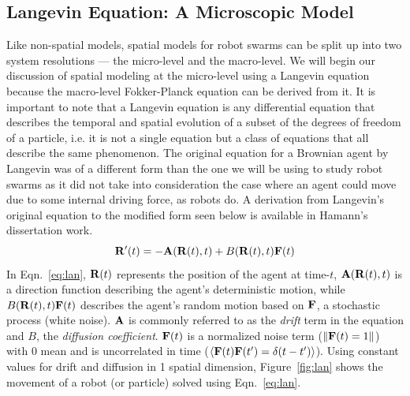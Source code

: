 \documentclass[Main.tex]{subfiles}
\begin{document}
\subsection{Langevin Equation: A Microscopic Model}
Like non-spatial models, spatial models for robot swarms can be split up into two system resolutions --- the micro-level and the macro-level. We will begin our discussion of spatial modeling at the micro-level using a Langevin equation because the macro-level Fokker-Planck equation can be derived from it. It is important to note that a Langevin equation is any differential equation that describes the temporal and spatial evolution of a subset of the degrees of freedom of a particle, i.e. it is not a single equation but a class of equations that all describe the same phenomenon. The original equation for a Brownian agent by Langevin was of a different form than the one we will be using to study robot swarms as it did not take into consideration the case where an agent could move due to some internal driving force, as robots do. A derivation from Langevin's original equation to the modified form seen below is available in Hamann's dissertation work\citep{Hamann2010}.
\begin{equation}\label{eq:lan}
\mathbf{R}'(t) = -\mathbf{A}(\mathbf{R}(t),t) + B(\mathbf{R}(t),t)\mathbf{F}(t)
\end{equation}
In Eqn.~\eqref{eq:lan}, $\mathbf{R}(t)$ represents the position of the agent at time-$t$, $\mathbf{A}(\mathbf{R}(t),t)$ is a direction function describing the agent's deterministic motion, while $B(\mathbf{R}(t),t)\mathbf{F}(t)$ describes the agent's random motion based on $\mathbf{F}$, a stochastic process (white noise). $\mathbf{A}$ is commonly referred to as the \emph{drift} term in the equation and $B$, the \emph{diffusion coefficient}. $\mathbf{F}(t)$ is a normalized noise term ($\lVert\mathbf{F}(t) = 1\rVert$) with 0 mean and is uncorrelated in time ($\left<\mathbf{F}(t)\mathbf{F}(t') = \delta(t - t')\right>$). Using constant values for drift and diffusion in 1 spatial dimension, Figure~\ref{fig:lan} shows the movement of a robot (or particle) solved using Eqn.~\eqref{eq:lan}.
\end{document}
